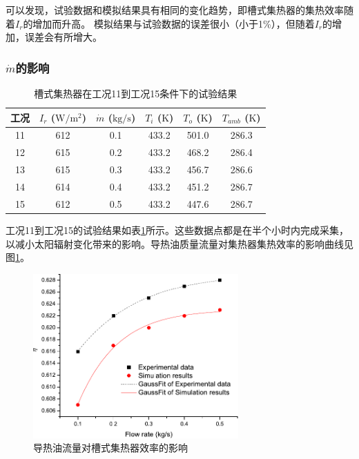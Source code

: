 可以发现，试验数据和模拟结果具有相同的变化趋势，即槽式集热器的集热效率随着$I_r$的增加而升高。
模拟结果与试验数据的误差很小（小于1\%），但随着$I_r$的增加，误差会有所增大。

\subsubsection{$\dot{m}$的影响}

\begin{table}[htbp]\footnotesize
	\caption{槽式集热器在工况11到工况15条件下的试验结果}
	\begin{center}
	\begin{tabular}{cccccc}
		\toprule
		工况	& $I_r$ ($\mathrm{W/m^2}$)	&	$\dot{m}$ ($\mathrm{kg/s}$)			&	$T_i$ ($\mathrm{K}$)	&	$T_o$ ($\mathrm{K}$)		&	$T_{amb}$ ($\mathrm{K}$)\\
		\midrule
		11	&	612	&	0.1	&	433.2	&	501.0	&	286.3\\
		12	&	615	&	0.2	&	433.2	&	468.2	&	286.4\\
		13	&	615	&	0.3	&	433.2	&	456.7	&	286.6	\\
		14	&	614	&	0.4	&	433.2	&	451.2	&	286.7\\
		15	&	612	&	0.5	&	433.2	&	447.6	&	286.7\\
		\bottomrule
	\end{tabular}
	\end{center}
	\label{tab:ResultOfTrough2}
\end{table}
工况11到工况15的试验结果如表\ref{tab:ResultOfTrough2}所示。这些数据点都是在半个小时内完成采集，以减小太阳辐射变化带来的影响。导热油质量流量对集热器集热效率的影响曲线见图\ref{fig:q_m-eta-trough}。

\begin{figure}[!ht]
\centering
\includegraphics[width=0.7\textwidth]{fig/q_m-eta-trough}
\caption{导热油流量对槽式集热器效率的影响}
\label{fig:q_m-eta-trough}
\end{figure}

